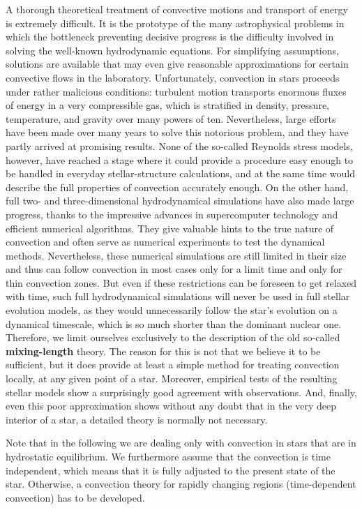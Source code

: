\documentclass[a4paper,10pt]{article}
\begin{document}
{\noindent}A thorough theoretical treatment of convective motions and transport of energy is extremely difficult. It is the prototype of the many astrophysical problems in which the bottleneck preventing decisive progress is the difficulty involved in solving the well-known hydrodynamic equations. For simplifying assumptions, solutions are available that may even give reasonable approximations for certain convective flows in the laboratory. Unfortunately, convection in stars proceeds under rather malicious conditions: turbulent motion transports enormous fluxes of energy in a very compressible gas, which is stratified in density, pressure, temperature, and gravity over many powers of ten. Nevertheless, large efforts have been made over many years to solve this notorious problem, and they have partly arrived at promising results. None of the so-called Reynolds stress models, however, have reached a stage where it could provide a procedure easy enough to be handled in everyday stellar-structure calculations, and at the same time would describe the full properties of convection accurately enough. On the other hand, full two- and three-dimensional hydrodynamical simulations have also made large progress, thanks to the impressive advances in supercomputer technology and efficient numerical algorithms. They give valuable hints to the true nature of convection and often serve as numerical experiments to test the dynamical methods. Nevertheless, these numerical simulations are still limited in their size and thus can follow convection in most cases only for a limit time and only for thin convection zones. But even if these restrictions can be foreseen to get relaxed with time, such full hydrodynamical simulations will never be used in full stellar evolution models, as they would unnecessarily follow the star's evolution on a dynamical timescale, which is so much shorter than the dominant nuclear one. Therefore, we limit ourselves exclusively to the description of the old so-called \textbf{mixing-length} theory. The reason for this is not that we believe it to be sufficient, but it does provide at least a simple method for treating convection locally, at any given point of a star. Moreover, empirical tests of the resulting stellar models show a surprisingly good agreement with observations. And, finally, even this poor approximation shows without any doubt that in the very deep interior of a star, a detailed theory is normally not necessary.

{\noindent}Note that in the following we are dealing only with convection in stars that are in hydrostatic equilibrium. We furthermore assume that the convection is time independent, which means that it is fully adjusted to the present state of the star. Otherwise, a convection theory for rapidly changing regions (time-dependent convection) has to be developed.
\end{document}
